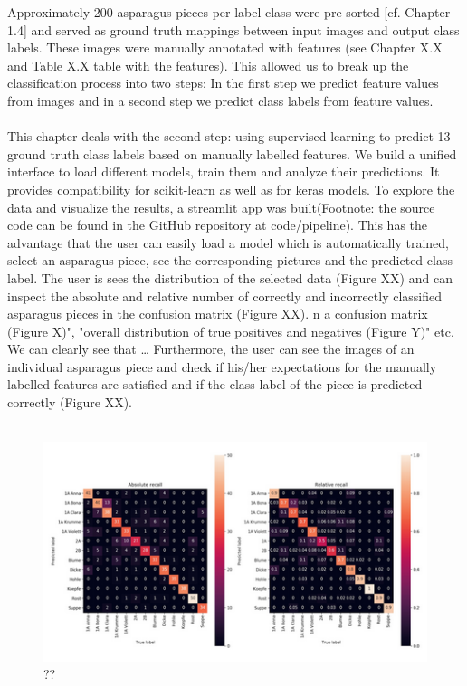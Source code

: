 Approximately 200 asparagus pieces per label class were pre-sorted [cf. Chapter 1.4] and served as ground truth mappings between input images and output class labels. These images were manually annotated with features (see Chapter X.X and Table X.X table with the features). This allowed us to break up the classification process into two steps: In the first step we predict feature values from images and in a second step we predict class labels from feature values. \\
\\
This chapter deals with the second step: using supervised learning to predict 13 ground truth class labels based on manually labelled features. We build a unified interface to load different models, train them and analyze their predictions. It provides compatibility for scikit-learn as well as for keras models. To explore the data and visualize the results, a streamlit app was built(Footnote: the source code can be found in the GitHub repository at code/pipeline). This has the advantage that the user can easily load a model which is automatically trained, select an asparagus piece, see the corresponding pictures and the predicted class label. The user is sees the distribution of the selected data (Figure XX) and can inspect the absolute and relative number of correctly and incorrectly classified asparagus pieces in the confusion matrix (Figure XX). n a confusion matrix (Figure X)", "overall distribution of true positives and negatives (Figure Y)" etc. We can clearly see that … Furthermore, the user can see the images of an individual asparagus piece and check if  his/her expectations for the manually labelled features are satisfied and if the class label of the piece is predicted correctly (Figure XX). \\
\\
\begin{figure}[h]
	\centering
	\includegraphics[scale=0.8]{Figures/chapter04/feature_to_label}
	\decoRule
	\caption[??]{??}
	\label{fig:FeatureToLabel}
\end{figure}


